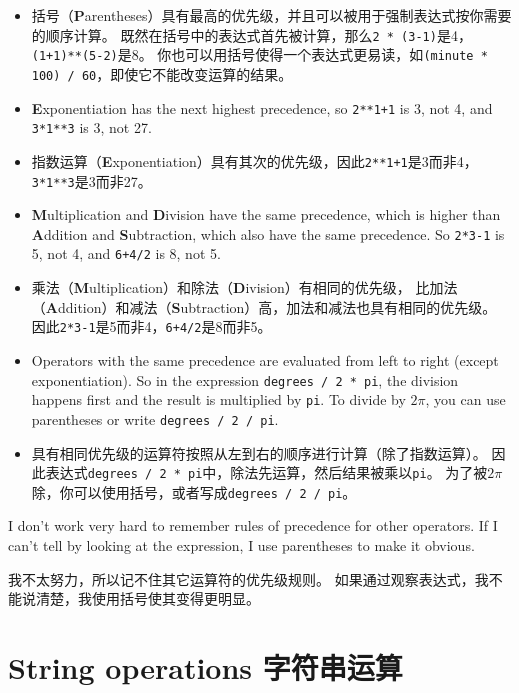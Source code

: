 \documentclass[10pt]{book}
\begin{document}
\begin{CJK}{UTF8}{gbsn}
\begin{itemize}
\item 括号（{\bf P}arentheses）具有最高的优先级，并且可以被用于强制表达式按你需要的顺序计算。
既然在括号中的表达式首先被计算，那么{\tt 2 * (3-1)}是4，{\tt (1+1)**(5-2)}是8。
你也可以用括号使得一个表达式更易读，如{\tt (minute * 100) / 60}，即使它不能改变运算的结果。

\item {\bf E}xponentiation has the next highest precedence, so
{\tt 2**1+1} is 3, not 4, and {\tt 3*1**3} is 3, not 27.

\item 指数运算（{\bf E}xponentiation）具有其次的优先级，因此{\tt 2**1+1}是3而非4，
{\tt 3*1**3}是3而非27。

\item {\bf M}ultiplication and {\bf D}ivision have the same precedence,
which is higher than {\bf A}ddition and {\bf S}ubtraction, which also
have the same precedence.  So {\tt 2*3-1} is 5, not 4, and
{\tt 6+4/2} is 8, not 5.

\item 乘法（{\bf M}ultiplication）和除法（{\bf D}ivision）有相同的优先级，
比加法（{\bf A}ddition）和减法（{\bf S}ubtraction）高，加法和减法也具有相同的优先级。
因此{\tt 2*3-1}是5而非4，{\tt 6+4/2}是8而非5。

\item Operators with the same precedence are evaluated from left to
  right (except exponentiation).  So in the expression {\tt degrees /
    2 * pi}, the division happens first and the result is multiplied
  by {\tt pi}.  To divide by $2 \pi$, you can use parentheses or write
  {\tt degrees / 2 / pi}.
  
\item 具有相同优先级的运算符按照从左到右的顺序进行计算（除了指数运算）。
因此表达式{\tt degrees / 2 * pi}中，除法先运算，然后结果被乘以{\tt pi}。
为了被$2 \pi$除，你可以使用括号，或者写成{\tt degrees / 2 / pi}。

\end{itemize}

I don't work very hard to remember rules of precedence for other
operators.  If I can't tell by looking at the expression, I use
parentheses to make it obvious.

我不太努力，所以记不住其它运算符的优先级规则。
如果通过观察表达式，我不能说清楚，我使用括号使其变得更明显。

\section{String operations 字符串运算}


\end{CJK}
\end{document}

